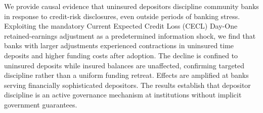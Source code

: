 
We provide causal evidence that uninsured depositors discipline community banks
in response to credit-risk disclosures, even outside periods of banking stress.
Exploiting the mandatory Current Expected Credit Loss (CECL) Day-One
retained-earnings adjustment as a predetermined information shock,
we find that banks with larger adjustments experienced contractions in uninsured
time deposits and higher funding costs after adoption.  The decline is confined
to uninsured deposits while insured balances are unaffected, confirming targeted
discipline rather than a uniform funding retreat.  Effects are amplified at
banks serving financially sophisticated depositors.  The results establish
that depositor discipline is an active governance mechanism at institutions
without implicit government guarantees.
